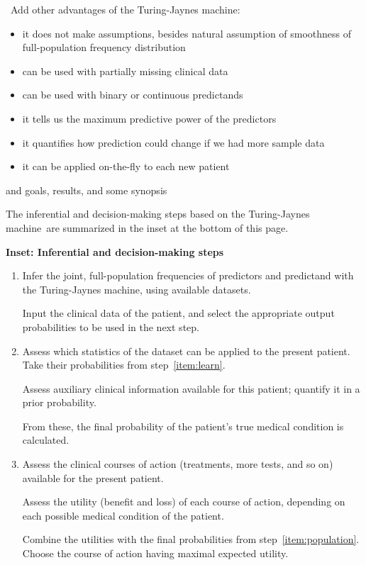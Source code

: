 \documentclass[utf8]{FrontiersinHarvard} %
\newcommand*{\pencil}{{\fontencoding{U}\fontfamily{fontawesometwo}\selectfont\symbol{210}}}
\newcommand{\mynotep}[1]{{\color{notecolour}\pencil\ #1}}
\renewcommand*{\|}[1][]{\nonscript\:#1\vert\nonscript\:\mathopen{}}
\newcommand*{\tjm}{Turing-Jaynes machine}
\begin{document}
\mynotep{Add other advantages of the \tjm: 
  \begin{itemize}
  \item it does not make assumptions, besides natural assumption of smoothness of full-population frequency distribution
  \item can be used with partially missing clinical data
  \item can be used with binary or continuous predictands
  \item it tells us the maximum predictive power of the predictors
  \item it quantifies how prediction could change if we had more sample data
  \item it can be applied on-the-fly to each new patient
  \end{itemize}
  and goals, results, and some synopsis}

The inferential and decision-making steps based on the \tjm\ are summarized in the inset at the bottom of this page.
\begin{table}[!b]  
  \begin{framed}
    \small
      \begin{center}
        \textbf{Inset: Inferential and decision-making steps}
  \end{center}
    
    \begin{enumerate}\itemsep1em 
    \item\label{item:learn} Infer the joint, full-population frequencies of predictors and predictand with the \tjm,  using available datasets.

      Input the clinical data of the patient, and select the appropriate output probabilities to be used in the next step.
      
    \item\label{item:population} Assess which statistics of the dataset can be applied to the present patient. Take their probabilities from step~\ref{item:learn}.

      Assess auxiliary clinical information available for this patient; quantify it in a prior probability.

      From these, the final probability of the patient's true medical condition is calculated.
      
    \item\label{item:utilities} Assess the clinical courses of action (treatments, more tests, and so on) available for the present patient.

      Assess the utility (benefit and loss) of each course of action, depending on each possible medical condition of the patient.

      Combine the utilities with the final probabilities from step~\ref{item:population}. Choose the course of action having maximal expected utility.  
    \end{enumerate}
  \end{framed}
\end{table}
\end{document}

